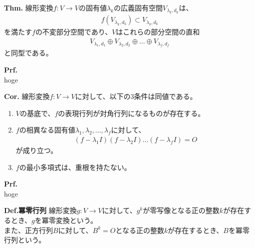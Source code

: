 \documentclass[a4paper,11pt]{jsarticle}
\numberwithin{equation}{section}
\begin{document}
\begin{itembox}[l]{\textbf{Thm.}}
    線形変換$f: V \to V$の固有値$\lambda_k$の広義固有空間$V_{\lambda_k,d_k}$は、
    \begin{align}
        f(V_{\lambda_k,d_k}) \subset V_{\lambda_k,d_k}
    \end{align}
    を満たす$f$の不変部分空間であり、$V$はこれらの部分空間の直和
    \begin{align}
      V_{\lambda_1,d_1} \oplus V_{\lambda_2,d_2} \oplus \dots \oplus V_{\lambda_f,d_f}
    \end{align}
    と同型である。
\end{itembox}
\textbf{Prf.}\\
hoge\hfill\qedsymbol\\

\begin{itembox}[l]{\textbf{Cor.}}
  線形変換$f: V \to V$に対して、以下の3条件は同値である。
  \begin{enumerate}
    \item $V$の基底で、$f$の表現行列が対角行列になるものが存在する。
    \item $f$の相異なる固有値$\lambda_1, \lambda_2, \dots, \lambda_f$に対して、
    \begin{align}
      (f-\lambda_1I)(f-\lambda_2I)\dots(f-\lambda_fI) = O
    \end{align}
    が成り立つ。
    \item $f$の最小多項式は、重根を持たない。
    \end{enumerate}
\end{itembox}
\textbf{Prf.}\\
hoge\hfill\qedsymbol\\

\begin{itembox}[l]{\textbf{Def.冪零行列}}
  線形変換$g:V \to V$に対して、$g^k$が零写像となる正の整数$k$が存在するとき、$g$を冪零変換という。\\
  また、正方行列$B$に対して、$B^k = O$となる正の整数$k$が存在するとき、$B$を冪零行列という。
\end{itembox}
\end{document}

